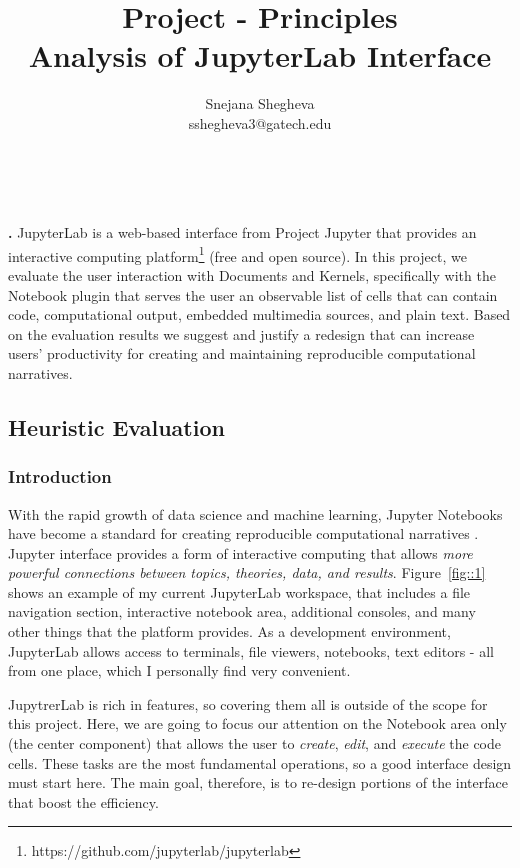 \documentclass[12pt,letterpaper]{article}
\makeatletter
\renewcommand{\maketitle}{\bgroup
   \begin{center}
   \textbf{{\fontsize{18pt}{20}\selectfont \@title}}\\
   \vspace{10pt}
   {\fontsize{12pt}{0}\selectfont \@author} 
   \end{center}
}
\newenvironment{myquote}[1]%
  {\list{}{\leftmargin=#1\rightmargin=#1}\item[]}%
  {\endlist}
\renewenvironment{abstract}
{\vspace*{-.5in}\fontsize{12pt}{12}\begin{myquote}{.5in}
\noindent \par{\bfseries \abstractname.}}
{\medskip\noindent
\end{myquote}
}
\makeatother
\begin{document}
\title{Project - Principles\\Analysis of JupyterLab Interface}
\author{Snejana Shegheva \\ sshegheva3@gatech.edu}

\maketitle
\thispagestyle{fancy}

\begin{abstract}
JupyterLab is a web-based interface from Project Jupyter that provides an interactive computing platform\footnote{https://github.com/jupyterlab/jupyterlab} (free and open source). In this project, we evaluate the user interaction with Documents and Kernels, specifically with the Notebook plugin that serves the user an observable list of cells that can contain code, computational output, embedded multimedia sources, and plain text. Based on the evaluation results we suggest and justify a redesign that can increase users' productivity for creating and maintaining reproducible computational narratives.
\end{abstract}

\subsection*{Heuristic Evaluation}

\subsubsection*{Introduction}
With the rapid growth of data science and machine learning, Jupyter Notebooks have become a standard for creating reproducible computational narratives \cite{perkel2018jupyter}. 
Jupyter interface provides a form of interactive computing that allows \textit{more powerful connections between topics, theories, data, and results}. Figure~\ref{fig::1} shows an example of my current JupyterLab workspace, that includes a file navigation section, interactive notebook area, additional consoles, and many other things that the platform provides. As a development environment, JupyterLab allows access to terminals, file viewers, notebooks, text editors - all from one place, which I personally find very convenient. 

JupytrerLab is rich in features, so covering them all is outside of the scope for this project. Here, we are going to focus our attention on the Notebook area only (the center component) that allows the user to \textit{create}, \textit{edit}, and \textit{execute} the code cells. These tasks are the most fundamental operations, so a good interface design must start here. The main goal, therefore, is to re-design portions of the interface that boost the efficiency.
\end{document}
